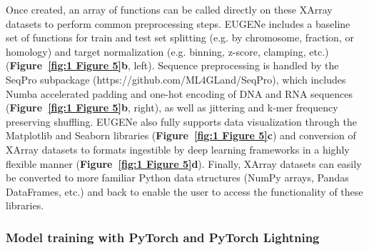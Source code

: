 Once created, an array of functions can be called directly on these XArray datasets to perform common preprocessing steps. EUGENe includes a baseline set of functions for train and test set splitting (e.g. by chromosome, fraction, or homology\cite{Teufel2023-kn}) and target normalization (e.g. binning, z-score, clamping, etc.) (\textbf{Figure~\ref{fig:1 Figure 5}\textbf{b}}, left). Sequence preprocessing is handled by the SeqPro subpackage (https://github.com/ML4GLand/SeqPro), which includes Numba accelerated\cite{Lam2015-mo} padding and one-hot encoding of DNA and RNA sequences (\textbf{Figure~\ref{fig:1 Figure 5}\textbf{b}}, right), as well as jittering and k-mer frequency preserving shuffling\cite{Jiang2008-li}. EUGENe also fully supports data visualization through the Matplotlib\cite{Hunter2007-es} and Seaborn\cite{Waskom2021-lk} libraries (\textbf{Figure~\ref{fig:1 Figure 5}\textbf{c}}) and conversion of XArray datasets to formats ingestible by deep learning frameworks in a highly flexible manner (\textbf{Figure~\ref{fig:1 Figure 5}\textbf{d}}). Finally, XArray datasets can easily be converted to more familiar Python data structures (NumPy arrays, Pandas DataFrames, etc.) and back to enable the user to access the functionality of these libraries.

\subsubsection{Model training with PyTorch and PyTorch Lightning}

